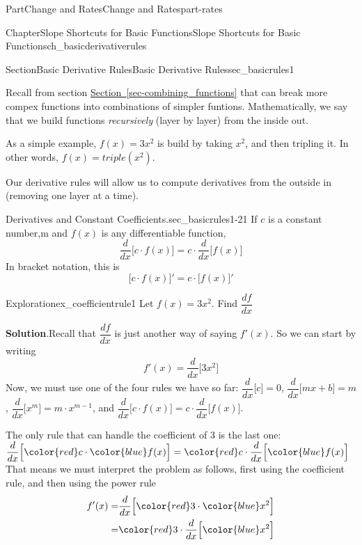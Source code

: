 \documentclass[oneside,10pt,]{tufte-book}
\newcommand{\blocktitlefont}{\relax}
\newcommand{\xreffont}{\relax}
\numberwithin{equation}{chapter}
\newcommand{\ddx}[1]{ \dfrac{d}{dx} \Big[ #1 \Big]  }
\newcommand{\D}[1]{ \Big[ #1 \Big]'  }
\newcommand{\amp}{&}
\begin{document}
\begin{partptx}{Part}{Change and Rates}{}{Change and Rates}{}{}{part-rates}
\begin{chapterptx}{Chapter}{Slope Shortcuts for Basic Functions}{}{Slope Shortcuts for Basic Functions}{}{}{ch_basicderivativerules}
\begin{sectionptx}{Section}{Basic Derivative Rules}{}{Basic Derivative Rules}{}{}{sec_basicrules1}
\par
Recall from section \hyperref[sec-combining_functions]{Section~{\xreffont\ref{sec-combining_functions}}} that can break more compex functions into combinations of simpler funtions. Mathematically, we say that we build functions \emph{recursively} (layer by layer) from the inside out.%
\par
As a simple example, \(f(x) = 3x^2\) is build by taking \(x^2\), and then tripling it.  In other words, \(f(x) = triple(x^2) \).%
\par
Our derivative rules will allow us to compute derivatives from the outside in (removing one layer at a time).%
\begin{paragraphs}{Derivatives and Constant Coefficients.}{sec_basicrules1-21}%
If \(c\) is a constant number,m and \(f(x)\) is any differentiable function,%
\begin{equation*}
\dfrac{d}{dx}\Big[c\cdot f(x) \Big] = c\cdot \dfrac{d}{dx}\Big[f(x)\Big]
\end{equation*}
In bracket notation, this is%
\begin{equation*}
\D{c \cdot f(x)}  = c\cdot \D{f(x)}
\end{equation*}
%
\end{paragraphs}%
\begin{exploration}{Exploration}{}{ex_coefficientrule1}%
Let \(f(x) = 3x^2\).  Find \(\dfrac{df}{dx}\)%
\par\smallskip%
\noindent\textbf{\blocktitlefont Solution}.\hypertarget{ex_coefficientrule1-2}{}\quad{}Recall that \(\dfrac{df}{dx}\) is just another way of saying \(f'(x)\). So we can start by writing%
\begin{equation*}
f'(x) = \dfrac{d}{dx}\Big[ 3x^2 \Big]
\end{equation*}
Now, we must use one of the four rules we have so far: \(\ddx{c} = 0\), \(\ddx{mx+b} = m\), \(\ddx{x^m} = m\cdot x^{m-1}\), and \(\dfrac{d}{dx}\Big[c\cdot f(x)\Big] = c\cdot \dfrac{d}{dx}\Big[f(x)\Big]\).%
\par
The only rule that can handle the coefficient of \(3\) is the last one: \(\dfrac{d}{dx}\Big[ {\color{red}c}\cdot {\color{blue}f(x)}
\Big]
= 
{\color{red} c}\cdot \dfrac{d}{dx}\Big[\color{blue} f(x)\Big]\) That means we must interpret the problem as follows, first using the coefficient rule, and then using the power rule\textasciigrave{}%
\begin{align*}
f'(x) =  \amp \dfrac{d}{dx}\Big[{\color{red} 3}\cdot {\color{blue}x^2} \Big]\\
= \amp {\color{red} 3}  \cdot \ddx{{\color{blue}x^2} } \\

\end{align*}
\end{exploration}
\end{sectionptx}
\end{chapterptx}
\end{partptx}
\end{document}
